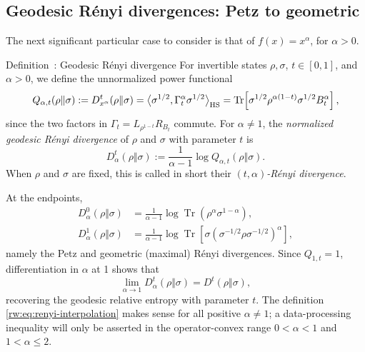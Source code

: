 \documentclass[11pt]{article}
\theoremstyle{remark}
\newcommand{\1}{\mathbbm{1}}
\begin{document}
\subsection{Geodesic Rényi divergences: Petz to geometric}
\label{rw:subsec:renyi-special-case}

The next significant particular case to consider is that of $f(x)=x^\alpha$, for $\alpha >0$. 

\begin{mainobject}{Definition~\thedefinition: Geodesic R\'enyi divergence}
For invertible states $\rho,\sigma$, $t\in[0,1]$, and $\alpha>0$,
we define the unnormalized power functional
\begin{equation}
 Q_{\alpha,t}(\rho\Vert\sigma)
 :=D_{x^\alpha}^t(\rho\Vert\sigma)
 =\big\langle\sigma^{1/2},
 \Gamma_t^\alpha\sigma^{1/2}\big\rangle_{\rm HS}=\operatorname{Tr}\!\left[
 \sigma^{1/2}\rho^{\alpha(1-t)}\sigma^{1/2}B_t^\alpha
 \right],
 \label{rw:eq:power-functional}
\end{equation}
since the two factors in $\Gamma_t=L_{\rho^{1-t}}R_{B_t}$
commute. For $\alpha\neq1$, the \textit{normalized geodesic Rényi divergence} of $\rho$ and $\sigma$ with parameter $t$ is
\begin{equation}
 D_\alpha^t(\rho\Vert\sigma)
 :=\frac{1}{\alpha-1}\log Q_{\alpha,t}(\rho\Vert\sigma).
 \label{rw:eq:renyi-interpolation}
\end{equation}
When $\rho$ and $\sigma$ are fixed, this is called in short their \textit{$(t,\alpha)$-Rényi divergence}.
\end{mainobject}

At the endpoints,
\begin{align}
 D_\alpha^0(\rho\Vert\sigma)
 &=\frac{1}{\alpha-1}
   \log\operatorname{Tr}(\rho^\alpha\sigma^{1-\alpha}),
 \label{rw:eq:petz-renyi-endpoint}\\
 D_\alpha^1(\rho\Vert\sigma)
 &=\frac{1}{\alpha-1}
   \log\operatorname{Tr}\!\left[
    \sigma(\sigma^{-1/2}\rho\sigma^{-1/2})^\alpha\right],
 \label{rw:eq:geometric-renyi-endpoint}
\end{align}
namely the Petz and geometric (maximal) Rényi divergences.  Since
$Q_{1,t}=1$, differentiation in $\alpha$ at 1 shows that
\begin{equation}
 \lim_{\alpha\to1}D_\alpha^t(\rho\Vert\sigma)
 =D^t(\rho\Vert\sigma),
 \label{rw:eq:renyi-alpha-one-limit}
\end{equation}
recovering the geodesic relative entropy with parameter $t$. The definition \eqref{rw:eq:renyi-interpolation} makes sense for all
positive $\alpha\neq1$; a data-processing inequality will only be asserted in
the operator-convex range $0<\alpha<1$ and $1<\alpha\leq2$.
\end{document}
